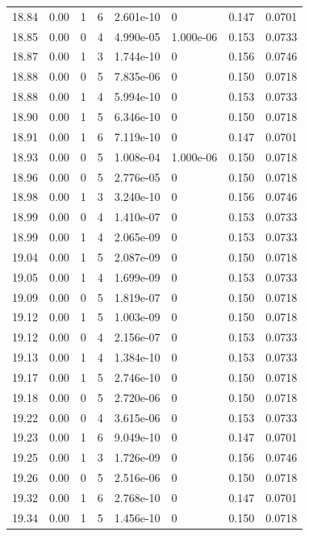 \documentclass[preview]{standalone}
\begin{document}
{{{{{{{{{{{{{{{{{{{\begin{tabular}{L{1.2cm}C{1.2cm} C{0.3cm}C{0.5cm} C{1.4cm}C{1.4cm} C{1.4cm}C{1.4cm}}
  18.84  &  0.00  & 1     &  6 &  2.601e-10  & 0  & 0.147 &  0.0701   \\ 
  18.85  &  0.00  & 0     &  4 &  4.990e-05  & 1.000e-06  & 0.153 &  0.0733   \\ 
  18.87  &  0.00  & 1     &  3 &  1.744e-10  & 0  & 0.156 &  0.0746   \\ 
  18.88  &  0.00  & 0     &  5 &  7.835e-06  & 0  & 0.150 &  0.0718   \\ 
  18.88  &  0.00  & 1     &  4 &  5.994e-10  & 0  & 0.153 &  0.0733   \\ 
  18.90  &  0.00  & 1     &  5 &  6.346e-10  & 0  & 0.150 &  0.0718   \\ 
  18.91  &  0.00  & 1     &  6 &  7.119e-10  & 0  & 0.147 &  0.0701   \\ 
  18.93  &  0.00  & 0     &  5 &  1.008e-04  & 1.000e-06  & 0.150 &  0.0718   \\ 
  18.96  &  0.00  & 0     &  5 &  2.776e-05  & 0  & 0.150 &  0.0718   \\ 
  18.98  &  0.00  & 1     &  3 &  3.240e-10  & 0  & 0.156 &  0.0746   \\ 
  18.99  &  0.00  & 0     &  4 &  1.410e-07  & 0  & 0.153 &  0.0733   \\ 
  18.99  &  0.00  & 1     &  4 &  2.065e-09  & 0  & 0.153 &  0.0733   \\ 
  19.04  &  0.00  & 1     &  5 &  2.087e-09  & 0  & 0.150 &  0.0718   \\ 
  19.05  &  0.00  & 1     &  4 &  1.699e-09  & 0  & 0.153 &  0.0733   \\ 
  19.09  &  0.00  & 0     &  5 &  1.819e-07  & 0  & 0.150 &  0.0718   \\ 
  19.12  &  0.00  & 1     &  5 &  1.003e-09  & 0  & 0.150 &  0.0718   \\ 
  19.12  &  0.00  & 0     &  4 &  2.156e-07  & 0  & 0.153 &  0.0733   \\ 
  19.13  &  0.00  & 1     &  4 &  1.384e-10  & 0  & 0.153 &  0.0733   \\ 
  19.17  &  0.00  & 1     &  5 &  2.746e-10  & 0  & 0.150 &  0.0718   \\ 
  19.18  &  0.00  & 0     &  5 &  2.720e-06  & 0  & 0.150 &  0.0718   \\ 
  19.22  &  0.00  & 0     &  4 &  3.615e-06  & 0  & 0.153 &  0.0733   \\ 
  19.23  &  0.00  & 1     &  6 &  9.049e-10  & 0  & 0.147 &  0.0701   \\ 
  19.25  &  0.00  & 1     &  3 &  1.726e-09  & 0  & 0.156 &  0.0746   \\ 
  19.26  &  0.00  & 0     &  5 &  2.516e-06  & 0  & 0.150 &  0.0718   \\ 
  19.32  &  0.00  & 1     &  6 &  2.768e-10  & 0  & 0.147 &  0.0701   \\ 
  19.34  &  0.00  & 1     &  5 &  1.456e-10  & 0  & 0.150 &  0.0718   \\ 
\hline 
\end{tabular} 

}}}}}}}}}}}}}}}}}}}
\end{document}
